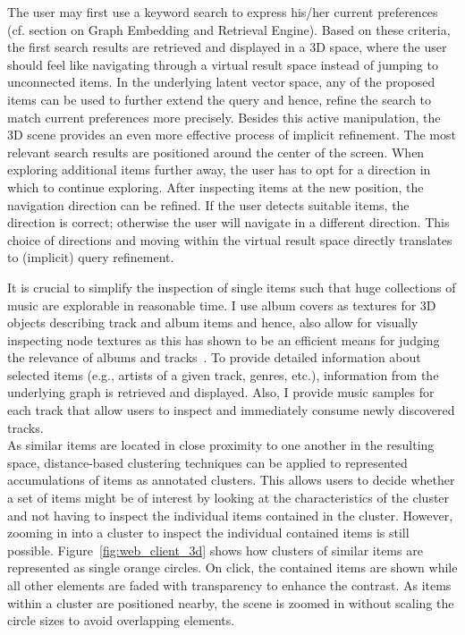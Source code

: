 \documentclass[sigconf]{acmart}
\begin{document}
The user may first use a keyword search to express his/her current preferences (cf. section on Graph Embedding and Retrieval Engine). Based on these criteria, the first search results are retrieved and displayed in a 3D space, where the user should feel like navigating through a virtual result space instead of jumping to unconnected items. In the underlying latent vector space, any of the proposed items can be used to further extend the query and hence, refine the search to match current preferences more precisely. Besides this active manipulation, the 3D scene provides an even more effective process of implicit refinement. The most relevant search results are positioned around the center of the screen. When exploring additional items further away, the user has to opt for a direction in which to continue exploring. After inspecting items at the new position, the navigation direction can be refined. If the user detects suitable items, the direction is correct; otherwise the user will navigate in a different direction. This choice of directions and moving within the virtual result space directly translates to (implicit) query refinement. 


It is crucial to simplify the inspection of single items such that huge collections of music are explorable in reasonable time. I use album covers as textures for 3D objects describing track and album items and hence, also allow for visually inspecting node textures as this has shown to be an efficient means for judging the relevance of albums and tracks~\cite{libeks2011you}. To provide detailed information about selected items (e.g., artists of a given track, genres, etc.), information from the underlying graph is retrieved and displayed. Also, I provide music samples for each track that allow users to inspect and immediately consume newly discovered tracks. \\

As similar items are located in close proximity to one another in the resulting space, distance-based clustering techniques can be applied to represented accumulations of items as annotated clusters. This allows users to decide whether a set of items might be of interest by looking at the characteristics of the cluster and not having to inspect the individual items contained in the cluster. However, zooming in into a cluster to inspect the individual contained items is still possible. Figure~\ref{fig:web_client_3d} shows how clusters of similar items are represented as single orange circles. On click, the contained items are shown while all other elements are faded with transparency to enhance the contrast. As items within a cluster are positioned nearby, the scene  is zoomed in without scaling the circle sizes to avoid overlapping elements.
\end{document}
